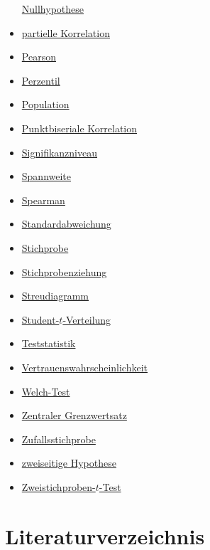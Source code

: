 \documentclass[
]{book}
\theoremstyle{definition}
\theoremstyle{definition}
\theoremstyle{definition}
\theoremstyle{definition}
\theoremstyle{remark}
\begin{document}
\begin{itemize}
  \hyperref[customdef-nullhypothese]{Nullhypothese}
\item
  \hyperref[customdef-partielle-korrelation]{partielle Korrelation}
\item
  \hyperref[customdef-pearson-korrelation]{Pearson}
\item
  \hyperref[customdef-perzentil]{Perzentil}
\item
  \hyperref[customdef-population]{Population}
\item
  \hyperref[customdef-punktbiseriale-korrelation]{Punktbiseriale Korrelation}
\item
  \hyperref[customdef-signifikanzniveau]{Signifikanzniveau}
\item
  \hyperref[customdef-spannweite]{Spannweite}
\item
  \hyperref[customdef-spearman-korrelation]{Spearman}
\item
  \hyperref[customdef-std]{Standardabweichung}
\item
  \hyperref[customdef-stichprobe]{Stichprobe}
\item
  \hyperref[customdef-stichprobenziehung]{Stichprobenziehung}
\item
  \hyperref[customdef-streudiagramm]{Streudiagramm}
\item
  \hyperref[customdef-student-verteilung]{Student-\(t\)-Verteilung}
\item
  \hyperref[customdef-teststatistik]{Teststatistik}
\item
  \hyperref[customdef-confidence-level]{Vertrauenswahrscheinlichkeit}
\item
  \hyperref[customdef-welch-test]{Welch-Test}
\item
  \hyperref[customdef-zentraler-grenzwertsatz]{Zentraler Grenzwertsatz}
\item
  \hyperref[customdef-zufallsstichprobe]{Zufallsstichprobe}
\item
  \hyperref[customdef-zweiseitige-hypothese]{zweiseitige Hypothese}
\item
  \hyperref[customdef-twosample-t-test]{Zweistichproben-\(t\)-Test}
\end{itemize}

\chapter*{Literaturverzeichnis}\label{literaturverzeichnis}

  
\end{document}
